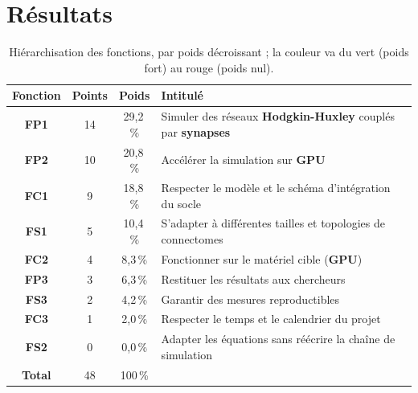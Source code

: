 \section{Résultats}

\begin{table}[H]
\centering
{\small
\begin{tabular}{|c|c|c|p{7.6cm}|}
\hline
\rowcolor{gray!15} \textbf{Fonction} & \textbf{Points} & \textbf{Poids} & \textbf{Intitulé} \\ \hline
\textbf{FP1} & \cellcolor{resVert} 14 & \cellcolor{resVert} 29,2\,\% & Simuler des réseaux \textbf{Hodgkin-Huxley} couplés par \textbf{synapses} \\ \hline
\textbf{FP2} & \cellcolor{resVert} 10 & \cellcolor{resVert} 20,8\,\% & Accélérer la simulation sur \textbf{GPU} \\ \hline
\textbf{FC1} & \cellcolor{resJaune} 9 & \cellcolor{resJaune} 18,8\,\% & Respecter le modèle et le schéma d'intégration du socle \\ \hline
\textbf{FS1} & \cellcolor{resJaune} 5 & \cellcolor{resJaune} 10,4\,\% & S'adapter à différentes tailles et topologies de connectomes \\ \hline
\textbf{FC2} & \cellcolor{resOrange} 4 & \cellcolor{resOrange} 8,3\,\% & Fonctionner sur le matériel cible (\textbf{GPU}) \\ \hline
\textbf{FP3} & \cellcolor{resOrange} 3 & \cellcolor{resOrange} 6,3\,\% & Restituer les résultats aux chercheurs \\ \hline
\textbf{FS3} & \cellcolor{resRougeC} 2 & \cellcolor{resRougeC} 4,2\,\% & Garantir des mesures reproductibles \\ \hline
\textbf{FC3} & \cellcolor{resRougeC} 1 & \cellcolor{resRougeC} 2,0\,\% & Respecter le temps et le calendrier du projet \\ \hline
\textbf{FS2} & \cellcolor{resRouge} 0 & \cellcolor{resRouge} 0,0\,\% & Adapter les équations sans réécrire la chaîne de simulation \\ \hline
\textbf{Total} & 48 & 100\,\% & \\ \hline
\end{tabular}}
\caption{Hiérarchisation des fonctions, par poids décroissant ; la couleur va du vert (poids fort) au rouge (poids nul).}
\label{tab:prio}
\end{table}

